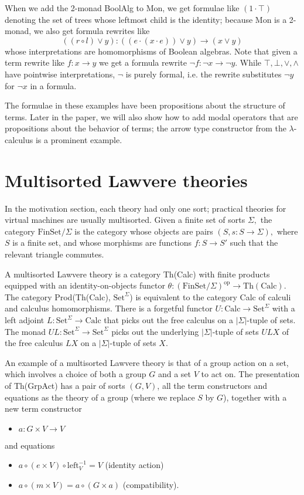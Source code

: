 \documentclass{llncs}
\newcommand{\maps}{\colon}
\renewcommand{\:}{\colon}
\newcommand{\FinSet}{\mathrm{FinSet}}
\newcommand{\Set}{\mathrm{Set}}
\newcommand{\Calc}{\mathrm{Calc}}
\newcommand{\leftu}{\mathrm{left}}
\newcommand{\op}{\mathrm{op}}
\begin{document}
When we add the 2-monad BoolAlg to Mon, we get formulae like $(1 \cdot
\top)$ denoting the set of trees whose leftmost child is the identity;
because Mon is a 2-monad, we also get formula rewrites like
\[ ((r \circ l) \lor y)\maps ((e \cdot (x \cdot e)) \lor y) \to (x \lor y) \]
whose interpretations are homomorphisms of Boolean algebras. Note that
given a term rewrite like $f \maps x \to y$ we get a formula rewrite
$\neg f \maps \neg x \to \neg y$. While $\top, \bot, \lor, \land$ have
pointwise interpretations, $\neg$ is purely formal, i.e. the rewrite
substitutes $\neg y$ for $\neg x$ in a formula.

The formulae in these examples have been propositions about the structure of terms.  Later in the paper, we will also show how to add modal operators that are propositions about the behavior of terms; the arrow type constructor from the $\lambda$-calculus is a prominent example.

\section{Multisorted Lawvere theories}
In the motivation section, each theory had only one sort; practical theories for virtual machines are usually multisorted.  Given a finite set of sorts $\Sigma,$ the category $\FinSet/\Sigma$ is the category whose objects are pairs $(S, s\maps S\to \Sigma),$ where $S$ is a finite set, and whose morphisms are functions $f\maps S \to S'$ such that the relevant triangle commutes.

A multisorted Lawvere theory is a category Th(Calc) with finite products equipped with an identity-on-objects functor ${\theta\maps (\FinSet/\Sigma)^\op \to \mathrm{Th(Calc)}.}$  The category Prod(Th(Calc), $\Set^\Sigma$) is equivalent to the category Calc of calculi and calculus homomorphisms.  There is a forgetful functor ${U\maps \Calc \to \Set^\Sigma}$ with a left adjoint ${L\maps \Set^\Sigma \to \Calc}$ that picks out the free calculus on a $|\Sigma|$-tuple of sets.  The monad ${UL\maps \Set^\Sigma \to \Set^\Sigma}$ picks out the underlying $|\Sigma|$-tuple of sets $ULX$ of the free calculus $LX$ on a $|\Sigma|$-tuple of sets $X$.

An example of a multisorted Lawvere theory is that of a group action on a set, which involves a choice of both a group $G$ and a set $V$ to act on.  The presentation of Th(GrpAct) has a pair of sorts $(G, V)$, all the term constructors and equations as the theory of a group (where we replace $S$ by $G$), together with a new term constructor
\begin{itemize}
  \item $a\maps G \times V \to V$
\end{itemize}
and equations
\begin{itemize}
  \item $a \circ (e \times V) \circ \leftu^{-1}_V = V$ (identity action)
  \item $a \circ (m \times V) = a \circ (G \times a)$ (compatibility).
\end{itemize}
\end{document}

